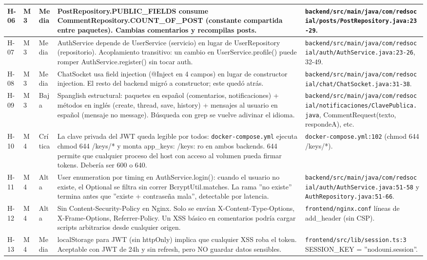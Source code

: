 \documentclass[10pt,a4paper]{article}
\newcommand{\code}[1]{\nolinkurl{#1}}
\begin{document}
\begin{xltabular}{\textwidth}{p{1.0cm} p{1.1cm} p{1.6cm} X >{\raggedright\arraybackslash}p{4.7cm}}
H-06 & M3 & Media & PostRepository.PUBLIC\_FIELDS consume CommentRepository.COUNT\_OF\_POST (constante compartida entre paquetes). Cambias comentarios y recompilas posts. & \code{backend/src/main/java/com/redsocial/posts/PostRepository.java:23-29}. \\ \midrule
H-07 & M3 & Media & AuthService depende de UserService (servicio) en lugar de UserRepository (repositorio). Acoplamiento transitivo: un cambio en UserService.profile() puede romper AuthService.register() sin tocar auth. & \code{backend/src/main/java/com/redsocial/auth/AuthService.java:23-26}, 32-49. \\ \midrule
H-08 & M3 & Media & ChatSocket usa field injection (@Inject en 4 campos) en lugar de constructor injection. El resto del backend migró a constructor; este quedó atrás. & \code{backend/src/main/java/com/redsocial/chat/ChatSocket.java:31-38}. \\ \midrule
H-09 & M3 & Baja & Spanglish estructural: paquetes en español (comentarios, notificaciones) + métodos en inglés (create, thread, save, history) + mensajes al usuario en español (mensaje no message). Búsqueda con grep se vuelve adivinar el idioma. & \code{backend/src/main/java/com/redsocial/notificaciones/ClavePublica.java}, CommentRequest(texto, respondeA), etc. \\ \midrule
H-10 & M4 & Crítica & La clave privada del JWT queda legible por todos: \code{docker-compose.yml} ejecuta chmod 644 /keys/* y monta app\_keys: /keys: ro en ambos backends. 644 permite que cualquier proceso del host con acceso al volumen pueda firmar tokens. Debería ser 600 o 640. & \code{docker-compose.yml:102} (chmod 644 /keys/*). \\ \midrule
H-11 & M4 & Alta & User enumeration por timing en AuthService.login(): cuando el usuario no existe, el Optional se filtra sin correr BcryptUtil.matches. La rama ''no existe'' termina antes que ''existe + contraseña mala'', detectable por latencia. & \code{backend/src/main/java/com/redsocial/auth/AuthService.java:51-58} y \code{AuthRepository.java:51-66}. \\ \midrule
H-12 & M4 & Alta & Sin Content-Security-Policy en Nginx. Solo se envían X-Content-Type-Options, X-Frame-Options, Referrer-Policy. Un XSS básico en comentarios podría cargar scripts arbitrarios desde cualquier origen. & \code{frontend/nginx.conf} líneas de add\_header (sin CSP). \\ \midrule
H-13 & M4 & Media & localStorage para JWT (sin httpOnly) implica que cualquier XSS roba el token. Aceptable con JWT de 24h y sin refresh, pero NO guardar datos sensibles. & \code{frontend/src/lib/session.ts:3} SESSION\_KEY = ''nodouni.session''. \\ \midrule

\end{xltabular}
\end{document}
